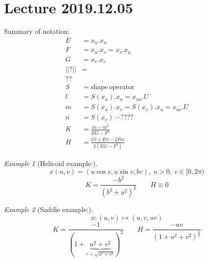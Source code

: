 \documentclass{article}
\let\ddd\cdots
\newcommand{\abs}[1]{\left|#1\right|}
\theoremstyle{definition}
\theoremstyle{remark}
\theoremstyle{example}
\newtheorem*{example}{Example}
\begin{document}
	\section*{Lecture 2019.12.05}
	Summary of notation:
	\begin{align*}
		E &= x_u.x_u\\
		F&=x_u.x_v=x_v.x_u\\
		G&=x_v.x_v\\
		\abs{\abs{?}}&=\\
		??\\
		S&=\mathrm{shape\ operator}\\
		l&=S(x_u).x_u = x_{uu}.U\\
		m&=S(x_u).x_v = S(x_v).x_u = x_{uv}.U\\
		n&=S(x_v)\ \ddd ????\\
		K&=\frac{ln-m^2}{EG-F^2}\\
		H&=\frac{Gl+En-2Fm}{2(EG-F^2)}		
	\end{align*}
	\begin{example}[Helicoid example:]
		\[x(u,v)= (u \cos v ,u \sin v, bv),\ u > 0,\ v \in [0,2\pi) \]
		\[K=\frac{-b^2}{(b^2+u^2)^2}\qquad H \equiv 0 \]
	\end{example}
	\begin{example}[Saddle example:]
		\[x:(u,v) \mapsto (u,v,uv)\]
		\[ K=\frac{-1}{(1+\underbrace{u^2+v^2}_{r=\sqrt{u^2+v^2}})^2} \qquad H=\frac{-uv}{(1+u^2+v^2)^{\frac{3}{2}}}\]
	\end{example}
\end{document}
